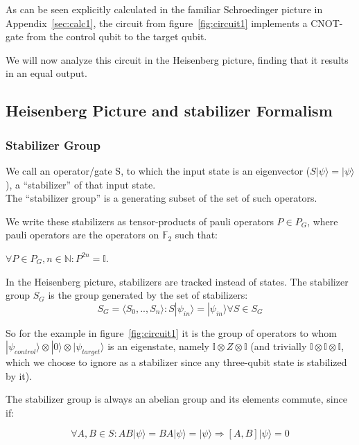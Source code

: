 As can be seen explicitly calculated in the familiar Schroedinger 
picture in Appendix~\ref{sec:calc1}, the circuit from figure~\ref{fig:circuit1}
implements a CNOT-gate from the control qubit to the target qubit.

We will now analyze this circuit in the Heisenberg picture,
finding that it results in an equal output.

\subsection{Heisenberg Picture and stabilizer Formalism}
\subsubsection{Stabilizer Group}
We call an operator/gate S, to which the input state is an 
eigenvector ($S|\psi\rangle=|\psi\rangle$), a ``stabilizer'' of that input state. \\
The ``stabilizer group'' is a generating subset of the set
of such operators.

We write these stabilizers as tensor-products of pauli operators
$P \in P_{G}$,
where pauli operators are the operators on $\mathbb{F}_{2}$ such that:

$\forall P\in P_{G}, n\in \mathbb{N}: P^{2n}=\mathbb{I}$.

In the Heisenberg picture, stabilizers are tracked instead of
states. 
The stabilizer group $S_{G}$ is the group generated by
the set of stabilizers:
\begin{equation}
	S_{G} = \langle S_{0},..,S_{n}\rangle: S|\psi_{in}\rangle = 
	|\psi_{in}\rangle \forall S \in S_{G}
\end{equation}

So for the example in figure~\ref{fig:circuit1} it is the group
of operators to whom
$|\psi_{control}\rangle \otimes |0\rangle \otimes 
|\psi_{target}\rangle$ is an eigenstate, namely 
$\mathbb{I}\otimes Z \otimes \mathbb{I}$ (and trivially
$\mathbb{I}\otimes\mathbb{I}\otimes\mathbb{I}$, which we choose
to ignore as a stabilizer since any three-qubit state
is stabilized by it).

The stabilizer group is always an abelian group and its elements 
 commute, since if:

\begin{equation}
	\label{abelian_stabilizers_equation}
	\forall A,B \in S: AB|\psi\rangle = BA|\psi\rangle = |\psi\rangle
	\Rightarrow [A,B]|\psi\rangle=0
\end{equation}

